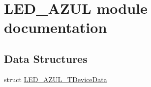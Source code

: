 \hypertarget{group___l_e_d___a_z_u_l__module}{}\section{L\+E\+D\+\_\+\+A\+Z\+UL module documentation}
\label{group___l_e_d___a_z_u_l__module}
\subsection*{Data Structures}
\begin{DoxyCompactItemize}
\item 
struct \hyperlink{struct_l_e_d___a_z_u_l___t_device_data}{L\+E\+D\+\_\+\+A\+Z\+U\+L\+\_\+\+T\+Device\+Data}
\end{DoxyCompactItemize}
